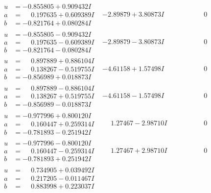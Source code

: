 \documentclass[1p]{elsarticle_modified}
\theoremstyle{definition}
\begin{document}
$$\begin{array}{c|c|c}
\begin{aligned}
u &= -0.855805 + 0.909432 I \\
a &= \phantom{-}0.197635 + 0.609389 I \\
b &= -0.821764 + 0.080284 I\end{aligned}
 & -2.89879 + 3.80873 I & \phantom{-0.000000 } 0 \\ \hline\begin{aligned}
u &= -0.855805 - 0.909432 I \\
a &= \phantom{-}0.197635 - 0.609389 I \\
b &= -0.821764 - 0.080284 I\end{aligned}
 & -2.89879 - 3.80873 I & \phantom{-0.000000 } 0 \\ \hline\begin{aligned}
u &= \phantom{-}0.897889 + 0.886104 I \\
a &= \phantom{-}0.138267 - 0.519755 I \\
b &= -0.856989 + 0.018873 I\end{aligned}
 & -4.61158 + 1.57498 I & \phantom{-0.000000 } 0 \\ \hline\begin{aligned}
u &= \phantom{-}0.897889 - 0.886104 I \\
a &= \phantom{-}0.138267 + 0.519755 I \\
b &= -0.856989 - 0.018873 I\end{aligned}
 & -4.61158 - 1.57498 I & \phantom{-0.000000 } 0 \\ \hline\begin{aligned}
u &= -0.977996 + 0.800120 I \\
a &= \phantom{-}0.160447 + 0.259314 I \\
b &= -0.781893 - 0.251942 I\end{aligned}
 & \phantom{-}1.27467 - 2.98710 I & \phantom{-0.000000 } 0 \\ \hline\begin{aligned}
u &= -0.977996 - 0.800120 I \\
a &= \phantom{-}0.160447 - 0.259314 I \\
b &= -0.781893 + 0.251942 I\end{aligned}
 & \phantom{-}1.27467 + 2.98710 I & \phantom{-0.000000 } 0 \\ \hline\begin{aligned}
u &= \phantom{-}0.734905 + 0.039492 I \\
a &= \phantom{-}0.217205 - 0.011467 I \\
b &= \phantom{-}0.883998 + 0.223037 I\end{aligned}

\end{array}$$
\end{document}
